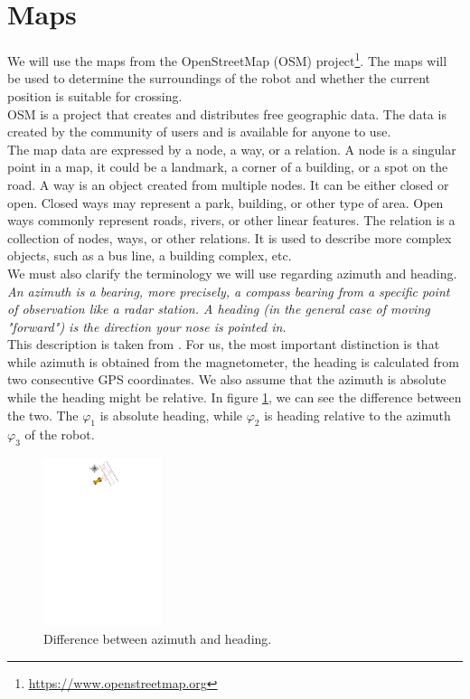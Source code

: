 \section{Maps}
    We will use the maps from the OpenStreetMap (OSM) project\footnote{\url{https://www.openstreetmap.org}}. The maps will be used to determine the surroundings of the robot and whether the current position is suitable for crossing.\\
    OSM is a project that creates and distributes free geographic data. The data is created by the community of users and is available for anyone to use. \cite{OSMwiki}\\
    The map data are expressed by a node, a way, or a relation. A node is a singular point in a map, it could be a landmark, a corner of a building, or a spot on the road. A way is an object created from multiple nodes. It can be either closed or open. Closed ways may represent a park, building, or other type of area. Open ways commonly represent roads, rivers, or other linear features. The relation is a collection of nodes, ways, or other relations. It is used to describe more complex objects, such as a bus line, a building complex, etc.\\
    We must also clarify the terminology we will use regarding azimuth and heading.\\
    \emph{An azimuth is a bearing, more precisely, a compass bearing from a specific point of observation like a radar station. A heading (in the general case of moving "forward") is the direction your nose is pointed in.}\\
    This description is taken from \cite{heading}. For us, the most important distinction is that while azimuth is obtained from the magnetometer, the heading is calculated from two consecutive GPS coordinates. We also assume that the azimuth is absolute while the heading might be relative. In figure \ref{fig:azi_head}, we can see the difference between the two. The $\varphi_{1}$ is absolute heading, while $\varphi_{2}$ is heading relative to the azimuth $\varphi_{3}$ of the robot.
    \begin{figure}[H]
        \centering
        \includegraphics[trim={0 27 0 0}, clip, height=4.9cm]{images/heading.pdf}
        \caption{Difference between azimuth and heading.}
        \label{fig:azi_head}
    \end{figure}
